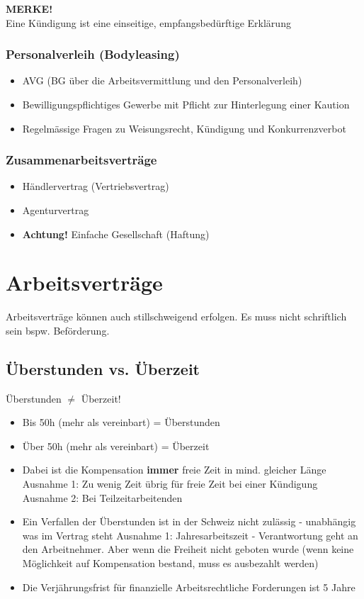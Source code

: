 \documentclass{report}
\theoremstyle{definition}
\theoremstyle{example}
\begin{document}
\textbf{MERKE!}\\
Eine Kündigung ist eine einseitige, empfangsbedürftige Erklärung

\subsubsection{Personalverleih (Bodyleasing)}
\begin{itemize}
   \item AVG (BG über die Arbeitsvermittlung und den Personalverleih)
   \item Bewilligungspflichtiges Gewerbe mit Pflicht zur Hinterlegung einer Kaution
   \item Regelmässige Fragen zu Weisungsrecht, Kündigung und Konkurrenzverbot
\end{itemize}

\subsubsection{Zusammenarbeitsverträge}
\begin{itemize}
   \item Händlervertrag (Vertriebsvertrag)
   \item Agenturvertrag
   \item \textbf{Achtung!} Einfache Gesellschaft (Haftung)
\end{itemize}

\section{Arbeitsverträge}
Arbeitsverträge können auch stillschweigend erfolgen. Es muss nicht schriftlich sein bspw. Beförderung.

\subsection{Überstunden vs. Überzeit}
Überstunden $\neq$ Überzeit! 
\begin{itemize}
   \item Bis 50h (mehr als vereinbart) = Überstunden
   \item Über 50h (mehr als vereinbart) = Überzeit
   \item Dabei ist die Kompensation \textbf{immer} freie Zeit in mind. gleicher Länge
   \subitem Ausnahme 1: Zu wenig Zeit übrig für freie Zeit bei einer Kündigung
   \subitem Ausnahme 2: Bei Teilzeitarbeitenden
   \item Ein Verfallen der Überstunden ist in der Schweiz nicht zulässig - unabhängig was im Vertrag steht
   \subitem Ausnahme 1: Jahresarbeitszeit - Verantwortung geht an den Arbeitnehmer. Aber wenn die Freiheit nicht geboten wurde (wenn keine Möglichkeit auf Kompensation bestand, muss es ausbezahlt werden)
   \item Die Verjährungsfrist für finanzielle Arbeitsrechtliche Forderungen ist 5 Jahre   
\end{itemize}
\end{document}
